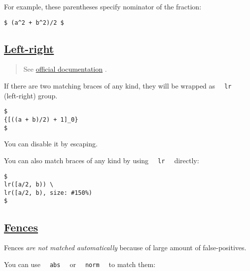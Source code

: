 For example, these parentheses specify nominator of the fraction:

\begin{verbatim}
$ (a^2 + b^2)/2 $
\end{verbatim}

\pandocbounded{}

\subsection{\texorpdfstring{\hyperref[left-right]{Left-right}}{Left-right}}\label{left-right}

\begin{quote}
See \href{https://typst.app/docs/reference/math/lr}{official
documentation} .
\end{quote}

If there are two matching braces of any kind, they will be wrapped as
\texttt{\ }{\texttt{\ lr\ }}\texttt{\ } (left-right) group.

\begin{verbatim}
$
{[((a + b)/2) + 1]_0}
$
\end{verbatim}

\pandocbounded{}

You can disable it by escaping.

You can also match braces of any kind by using
\texttt{\ }{\texttt{\ lr\ }}\texttt{\ } directly:

\begin{verbatim}
$
lr([a/2, b)) \
lr([a/2, b), size: #150%)
$
\end{verbatim}

\pandocbounded{}

\subsection{\texorpdfstring{\hyperref[fences]{Fences}}{Fences}}\label{fences}

Fences \emph{are not matched automatically} because of large amount of
false-positives.

You can use \texttt{\ }{\texttt{\ abs\ }}\texttt{\ } or
\texttt{\ }{\texttt{\ norm\ }}\texttt{\ } to match them:


